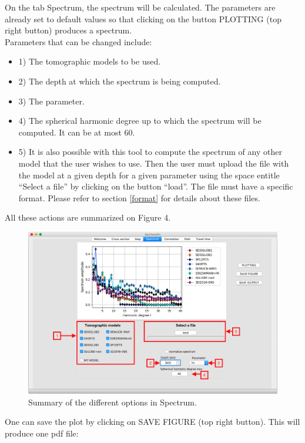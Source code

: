 \documentclass[12pt]{article}
\begin{document}
On the tab Spectrum, the spectrum will be calculated. The parameters are already
set to default values so that clicking on the button
PLOTTING (top right button) produces a spectrum.\\


Parameters that can be changed include: 
\begin{itemize}
\item 1) The tomographic models to be
used.
\item 2) The depth at which the spectrum is being computed.
\item 3) The parameter.
\item 4) The spherical harmonic degree up to which the spectrum will be
    computed. It can be at most 60.
  \item 5)  It is also possible with this tool to compute the spectrum of any
    other model that the user wishes to use. Then the user must upload the
    file with the model at a given depth for a given parameter using the
    space entitle ``Select a file'' by clicking on the button ``load''.
    The file must have a specific format. Please refer to  section \ref{format} for details about these files.
\end{itemize}
All these actions are summarized on Figure 4.

\begin{figure}
\begin{center}
\includegraphics[scale=0.35]{SeisTomoPy_notebook/figures/specpy.png}
\caption{Summary of the different options in Spectrum.}
\label{specpy}
\end{center}
\end{figure}

One can save the plot by clicking on SAVE FIGURE (top right button).
This will produce one pdf file:
\end{document}
